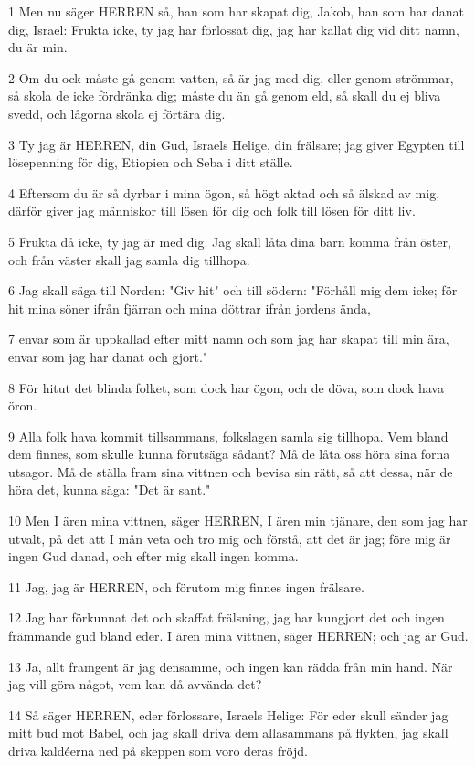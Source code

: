 \par 1 Men nu säger HERREN så, han som har skapat dig, Jakob, han som har danat dig, Israel: Frukta icke, ty jag har förlossat dig, jag har kallat dig vid ditt namn, du är min.
\par 2 Om du ock måste gå genom vatten, så är jag med dig, eller genom strömmar, så skola de icke fördränka dig; måste du än gå genom eld, så skall du ej bliva svedd, och lågorna skola ej förtära dig.
\par 3 Ty jag är HERREN, din Gud, Israels Helige, din frälsare; jag giver Egypten till lösepenning för dig, Etiopien och Seba i ditt ställe.
\par 4 Eftersom du är så dyrbar i mina ögon, så högt aktad och så älskad av mig, därför giver jag människor till lösen för dig och folk till lösen för ditt liv.
\par 5 Frukta då icke, ty jag är med dig. Jag skall låta dina barn komma från öster, och från väster skall jag samla dig tillhopa.
\par 6 Jag skall säga till Norden: "Giv hit" och till södern: "Förhåll mig dem icke; för hit mina söner ifrån fjärran och mina döttrar ifrån jordens ända,
\par 7 envar som är uppkallad efter mitt namn och som jag har skapat till min ära, envar som jag har danat och gjort."
\par 8 För hitut det blinda folket, som dock har ögon, och de döva, som dock hava öron.
\par 9 Alla folk hava kommit tillsammans, folkslagen samla sig tillhopa. Vem bland dem finnes, som skulle kunna förutsäga sådant? Må de låta oss höra sina forna utsagor. Må de ställa fram sina vittnen och bevisa sin rätt, så att dessa, när de höra det, kunna säga: "Det är sant."
\par 10 Men I ären mina vittnen, säger HERREN, I ären min tjänare, den som jag har utvalt, på det att I mån veta och tro mig och förstå, att det är jag; före mig är ingen Gud danad, och efter mig skall ingen komma.
\par 11 Jag, jag är HERREN, och förutom mig finnes ingen frälsare.
\par 12 Jag har förkunnat det och skaffat frälsning, jag har kungjort det och ingen främmande gud bland eder. I ären mina vittnen, säger HERREN; och jag är Gud.
\par 13 Ja, allt framgent är jag densamme, och ingen kan rädda från min hand. När jag vill göra något, vem kan då avvända det?
\par 14 Så säger HERREN, eder förlossare, Israels Helige: För eder skull sänder jag mitt bud mot Babel, och jag skall driva dem allasammans på flykten, jag skall driva kaldéerna ned på skeppen som voro deras fröjd.

